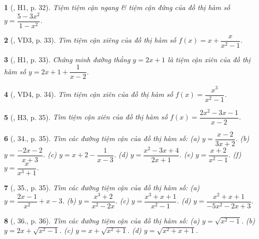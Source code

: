 \documentclass{article}
\newtheorem{baitoan}{}
\begin{document}
\begin{baitoan}[\cite{SGK_Toan_12_giai_tich_nang_cao}, H1, p. 32]
	Tiệm tiệm cận ngang \& tiệm cận đứng của đồ thị hàm số $y = \dfrac{5 - 3x^2}{1 - x^2}$.
\end{baitoan}

\begin{baitoan}[\cite{SGK_Toan_12_giai_tich_nang_cao}, VD3, p. 33]
	Tìm tiệm cận xiêng của đồ thị hàm số $f(x) = x + \dfrac{x}{x^2 - 1}$.
\end{baitoan}

\begin{baitoan}[\cite{SGK_Toan_12_giai_tich_nang_cao}, H1, p. 33]
	Chứng minh đường thẳng $y = 2x + 1$ là tiệm cận xiên của đồ thị hàm số $y = 2x + 1 + \dfrac{1}{x - 2}$.
\end{baitoan}

\begin{baitoan}[\cite{SGK_Toan_12_giai_tich_nang_cao}, VD4, p. 34]
	Tìm tiệm cận xiên của đồ thị hàm số $f(x) = \dfrac{x^3}{x^2 - 1}$.
\end{baitoan}

\begin{baitoan}[\cite{SGK_Toan_12_giai_tich_nang_cao}, H3, p. 35]
	Tìm tiệm cận xiên của đồ thị hàm số $f(x) = \dfrac{2x^2 - 3x - 1}{x - 2}$.
\end{baitoan}

\begin{baitoan}[\cite{SGK_Toan_12_giai_tich_nang_cao}, 34., p. 35]
	Tìm các đường tiệm cận của đồ thị hàm số: (a) $y = \dfrac{x - 2}{3x + 2}$. (b) $y = \dfrac{-2x - 2}{x + 3}$. (c) $y = x + 2 - \dfrac{1}{x - 3}$. (d) $y = \dfrac{x^2 - 3x + 4}{2x + 1}$. (e) $y = \dfrac{x + 2}{x^2 - 1}$. (f) $y = \dfrac{x}{x^3 + 1}$.
\end{baitoan}

\begin{baitoan}[\cite{SGK_Toan_12_giai_tich_nang_cao}, 35., p. 35]
	Tìm các đường tiệm cận của đồ thị hàm số: (a) $y = \dfrac{2x - 1}{x^2} + x - 3$. (b) $y = \dfrac{x^3 + 2}{x^2 - 2x}$. (c) $y = \dfrac{x^3 + x + 1}{x^2 - 1}$. (d) $y = \dfrac{x^2 + x + 1}{-5x^2 - 2x + 3}$.
\end{baitoan}

\begin{baitoan}[\cite{SGK_Toan_12_giai_tich_nang_cao}, 36., p. 36]
	Tìm các đường tiệm cận của đồ thị hàm số: (a) $y = \sqrt{x^2 - 1}$. (b) $y = 2x + \sqrt{x^2 - 1}$. (c) $y = x + \sqrt{x^2 + 1}$. (d) $y = \sqrt{x^2 + x + 1}$.
\end{baitoan}
\end{document}
